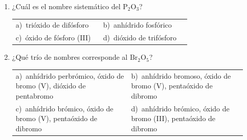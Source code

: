 \documentclass[11pt,a4paper]{article}
\begin{document}
\begin{enumerate}[label=\textbf{\arabic*.},leftmargin=*,itemsep=11pt,topsep=0pt]
\item \begin{minipage}[t]{\linewidth}
¿Cuál es el nombre sistemático del $\mathrm{P_{2}O_{3}}$?

\vspace{5pt}
\begin{tabular}{@{}p{0.47\linewidth}p{0.47\linewidth}@{}}
a)~trióxido de difósforo & b)~anhídrido fosfórico \\
c)~óxido de fósforo (III) & d)~dióxido de trifósforo \\
\end{tabular}
\end{minipage}

\item \begin{minipage}[t]{\linewidth}
¿Qué trío de nombres corresponde al $\mathrm{Br_{2}O_{5}}$?

\vspace{5pt}
\begin{tabular}{@{}p{0.47\linewidth}p{0.47\linewidth}@{}}
a)~anhídrido perbrómico, óxido de bromo (V), dióxido de pentabromo & b)~anhídrido bromoso, óxido de bromo (V), pentaóxido de dibromo \\
c)~anhídrido brómico, óxido de bromo (V), pentaóxido de dibromo & d)~anhídrido brómico, óxido de bromo (III), pentaóxido de dibromo \\
\end{tabular}
\end{minipage}

\end{enumerate}
\end{document}
